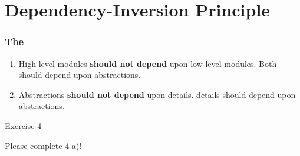\documentclass[9pt,handout]{beamer}
\begin{document}
\section{Dependency-Inversion Principle}
\begin{frame}
  \frametitle{The \secname}
  \begin{theorem}
    \begin{enumerate}
    \item High level modules \textbf{should not depend} upon low
      level modules. Both should depend upon abstractions.
    \item Abstractions \textbf{should not depend} upon details. details
      should depend upon abstractions.
    \end{enumerate}
  \end{theorem}
\pause
\vfill
\begin{exampleblock}{Exercise 4}
  \begin{center}
    Please complete 4 a)!
  \end{center}
\end{exampleblock}
\end{frame}
\end{document}
